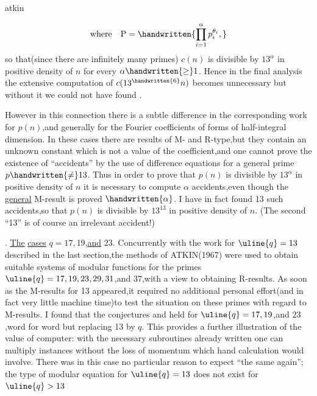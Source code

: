 \noindent\hfill atkin 

\[
\text{where}\quad\mathrm{P}=\handwritten{\prod_{i=1}^{\alpha}p_i^{\theta_i},}
\]
\noindent so that(since there are infinitely many primes) \uline{$c(n)$} is divisible by $13^{\alpha}$ in positive density of $n$ for every $\alpha\handwritten{\geq}1$. Hence in the final analysis the extensive computation of $c(13^{\handwritten{6}}n)$ becomes unnecessary  but without it we could not have found .

However in this connection there is a subtle difference in the corresponding work for \uline{$p(n)$},and generally for the Fourier coefficients of forms of half-integral dimension. In these cases there are results of M- and R-type,but they contain an unknown constant which is not a value of the coefficient,and one cannot prove the existence of ``accidents'' by the use of difference equations for a general prime $p\handwritten{\ne}13$. Thus in order to prove that \uline{$p(n)$} is divisible by $13^{\alpha}$ in positive density of \uline{$n$} it is necessary to compute $\alpha$ accidents,even though the \uline{general} M-result is proved  $\handwritten{\alpha}$.\margin{\handwritten{\rlap{$\unsure{\delta|\text{\S}}$}/}} I have in fact found 13 such accidents,so that \uline{$p(n)$} is divisible by $13^{13}$ in positive density of $n$. (The second ``13'' is of course an irrelevant accident!)

\noindent {}. \uline{The} \uline{cases} $q=17,19$,\uline{and} $23$. Concurrently with the work for $\uline{q}=13$ described in the last section,the methods of ATKIN(1967) were used to obtain suitable systems of modular functions for the primes $\uline{q}=17,19,23,29,31$,and $37$,with a view to obtaining  \margin{\handwritten{$\delta$/}}R-results. As soon as the M-results for 13 appeared,it required no additional personal effort(and in fact very little machine time)to test the situation on these primes with regard to M-results. I found that the conjectures  and  held for $\uline{q}=17,19$,and $23$,word for word but replacing 13 by \uline{$q$}. This provides a further illustration of the value of  computer: with the necessary subroutines already written one can multiply instances without the loss of momentum which hand calculation would involve. There was in this case no particular reason to expect ``the same again''; the type of modular equation for $\uline{q}=13$ does not exist for $\uline{q}>13$


